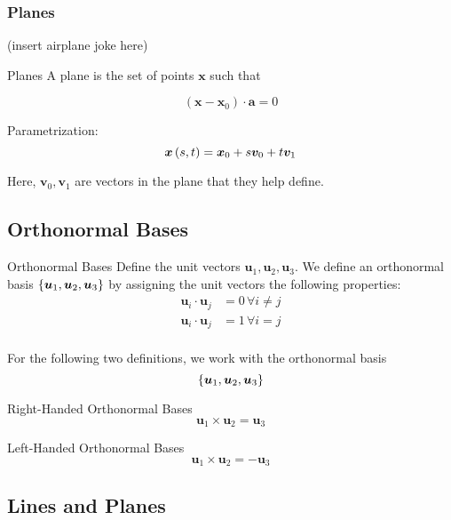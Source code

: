 \documentclass[11pt]{article}
\begin{document}
\subsubsection{Planes}
(insert airplane joke here)


\begin{definition}{Planes}
  A plane is the set of points $\bm{x}$ such that
  
  $$(\bm{x} - \bm{x}_0) \cdot \bm{a} = 0$$

  Parametrization:
  $$\bm{x} \left ( s, t \right) = \bm{x}_0 + s \bm{v}_0 + t \bm{v}_1$$

  Here, $\bm{v}_0, \bm{v}_1$ are vectors in the plane that they help define.
  
\end{definition}







\subsection{Orthonormal Bases}

\begin{definition}{Orthonormal Bases}
  Define the unit vectors $\bm{u}_1, \bm{u}_2, \bm{u}_3$.
  We define an orthonormal basis $\left \{ \bm{u}_1, \bm{u}_2, \bm{u}_3 \right \}$ by assigning the unit vectors the following properties:
  \begin{align*}
    \bm{u}_i \cdot \bm{u}_j &= 0\, \forall i \neq j \\
    \bm{u}_i \cdot \bm{u}_j &= 1\, \forall i = j \\
  \end{align*}
\end{definition}

For the following two definitions, we work with the orthonormal basis
$$\left \{ \bm{u}_1, \bm{u}_2, \bm{u}_3 \right \}$$

\begin{definition}{Right-Handed Orthonormal Bases}
  $$
  \bm{u}_1 \times \bm{u}_2 = \bm{u}_3
  $$
\end{definition}

\begin{definition}{Left-Handed Orthonormal Bases}
  $$
  \bm{u}_1 \times \bm{u}_2 = - \bm{u}_3
  $$
\end{definition}



\subsection{Lines and Planes}
\end{document}
